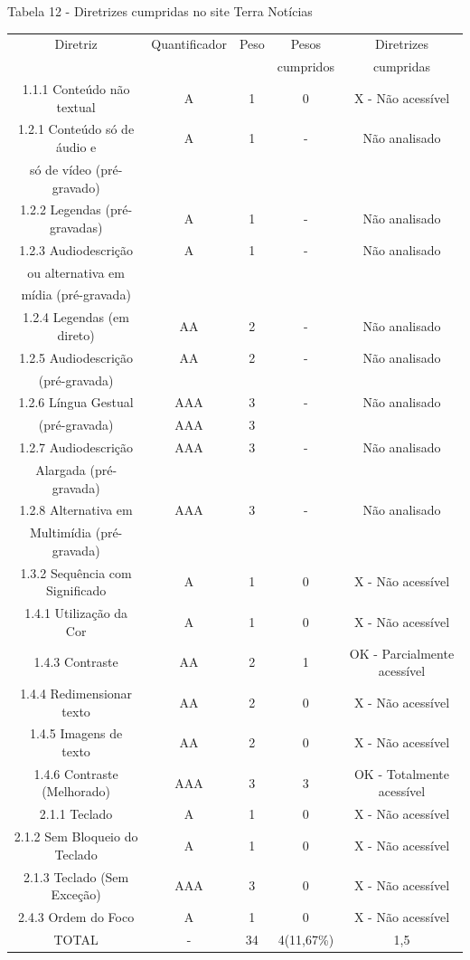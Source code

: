 \documentclass[a4paper]{article}
\begin{document}
\begin{titlepage}
Tabela 12 - Diretrizes cumpridas no site Terra Notícias\\[-1cm]
\begin{center}
	\fontsize{8pt}{8pt}\selectfont	
	\begin{longtable}{|c|c|c|c|c|}
		\hline
		Diretriz & Quantificador & Peso & Pesos & Diretrizes\\
		& & & cumpridos & cumpridas\\
		\hline
		1.1.1 Conteúdo não textual & A & 1 & 0 & X - Não acessível \\
		\hline
		1.2.1 Conteúdo só de áudio e & A & 1 & - & Não analisado \\
		só de vídeo (pré-gravado) & & & & \\
		\hline
		1.2.2 Legendas (pré-gravadas) & A & 1 & - & Não analisado \\
		\hline
		1.2.3 Audiodescrição & A & 1 & - & Não analisado \\
		ou alternativa em & & & & \\
		mídia (pré-gravada) & & & & \\
		\hline
		1.2.4 Legendas (em direto) & AA & 2 & - & Não analisado \\
		\hline
		1.2.5 Audiodescrição & AA & 2 & - & Não analisado \\
		(pré-gravada) & & & & \\
		\hline
		1.2.6 Língua Gestual & AAA & 3 & - & Não analisado \\
		(pré-gravada) & AAA & 3 & & \\
		\hline
		1.2.7 Audiodescrição & AAA & 3 & - & Não analisado \\
		Alargada (pré-gravada) & & & & \\
		\hline
		1.2.8 Alternativa em & AAA & 3 & - & Não analisado \\
		Multimídia (pré-gravada) & & & & \\
		\hline
		1.3.2 Sequência com Significado & A & 1 & 0 & X - Não acessível \\
		\hline
		1.4.1 Utilização da Cor & A & 1 & 0 & X - Não acessível \\
		\hline
		1.4.3 Contraste & AA & 2 & 1 & OK - Parcialmente acessível \\
		\hline
		1.4.4 Redimensionar texto & AA & 2 & 0 & X - Não acessível \\
		\hline
		1.4.5 Imagens de texto & AA & 2 & 0 & X - Não acessível \\
		\hline
		1.4.6 Contraste (Melhorado) & AAA & 3 & 3 & OK - Totalmente acessível \\
		\hline
		2.1.1 Teclado & A & 1 & 0 & X - Não acessível \\
		\hline
		2.1.2 Sem Bloqueio do Teclado & A & 1 & 0 & X - Não acessível \\
		\hline
		2.1.3 Teclado (Sem Exceção) & AAA & 3 & 0 & X - Não acessível \\
		\hline
		2.4.3 Ordem do Foco & A & 1 & 0 & X - Não acessível \\
		\hline
		TOTAL & - & 34 & 4(11,67\%) & 1,5 \\
		\hline
	\end{longtable}
\end{center}


\end{titlepage}
\end{document}
